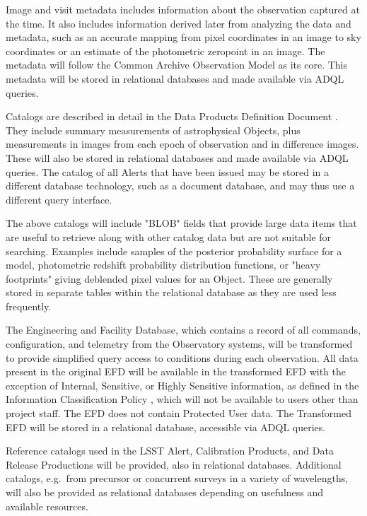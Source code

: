 Image and visit metadata includes information about the observation captured at
the time.  It also includes information derived later from analyzing the data
and metadata, such as an accurate mapping from pixel coordinates in an image to
sky coordinates or an estimate of the photometric zeropoint in an image.  The
metadata will follow the Common Archive Observation Model \citep{2012ASPC..461..339D,CAOM2} as its
core.  This metadata will be stored in relational databases and made available
via ADQL queries.

Catalogs are described in detail in the Data Products Definition Document
.  They include summary measurements of astrophysical Objects,
plus measurements in images from each epoch of observation and in difference
images.  These will also be stored in relational databases and made available
via ADQL queries.  The catalog of all Alerts that have been issued may be
stored in a different database technology, such as a document database, and
may thus use a different query interface.

The above catalogs will include "BLOB" fields that provide large data items
that are useful to retrieve along with other catalog data but are not
suitable for searching.  Examples include samples of the posterior probability
surface for a model, photometric redshift probability distribution functions,
or "heavy footprints" giving deblended pixel values for an Object.  These
are generally stored in separate tables within the relational database as
they are used less frequently.

The Engineering and Facility Database, which contains a record of all commands,
configuration, and telemetry from the Observatory systems, will be transformed
to provide simplified query access to conditions during each observation.  All
data present in the original EFD will be available in the transformed EFD with
the exception of Internal, Sensitive, or Highly Sensitive information, as
defined in the Information Classification Policy , which will
not be available to users other than project staff.  The EFD does not contain
Protected User data.  The Transformed EFD will be stored in a relational
database, accessible via ADQL queries.

Reference catalogs used in the LSST Alert, Calibration Products, and Data
Release Productions will be provided, also in relational databases.  Additional
catalogs, e.g.\ from precursor or concurrent surveys in a variety of
wavelengths, will also be provided as relational databases depending on
usefulness and available resources.

